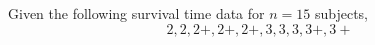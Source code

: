 \documentclass[12pt]{article}
\begin{document}
Given the following survival time data for $n = 15$ subjects,
$$
2, 2, 2+, 2+, 2+, 3, 3, 3, 3+, 3+
$$
\end{document}
